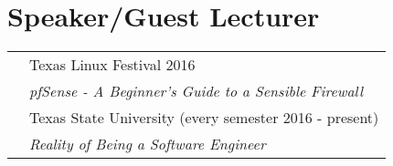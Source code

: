 \documentclass[10pt]{article} %
\begin{document}
\begin{minipage}[t]{0.5\textwidth}
\section{Speaker/Guest Lecturer}

\begin{tabular}{rl}
& Texas Linux Festival 2016\\
& \quad \textit{pfSense - A Beginner's Guide to a Sensible Firewall} \\
& Texas State University (every semester 2016 - present)\\
& \quad \textit{Reality of Being a Software Engineer}\\
\end{tabular}\\[10pt]


\end{minipage} %
\hfill
\end{document}
